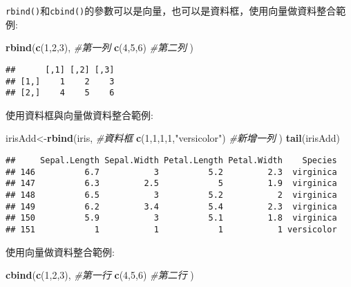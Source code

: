 \documentclass[]{book}
\newenvironment{Shaded}{\begin{snugshade}}{\end{snugshade}}
\newcommand{\KeywordTok}[1]{\textcolor[rgb]{0.13,0.29,0.53}{\textbf{{#1}}}}
\newcommand{\DecValTok}[1]{\textcolor[rgb]{0.00,0.00,0.81}{{#1}}}
\newcommand{\StringTok}[1]{\textcolor[rgb]{0.31,0.60,0.02}{{#1}}}
\newcommand{\CommentTok}[1]{\textcolor[rgb]{0.56,0.35,0.01}{\textit{{#1}}}}
\newcommand{\NormalTok}[1]{{#1}}
\begin{document}
\texttt{rbind()}和\texttt{cbind()}的參數可以是向量，也可以是資料框，使用向量做資料整合範例:

\begin{Shaded}
\begin{Highlighting}[]
\KeywordTok{rbind}\NormalTok{(}\KeywordTok{c}\NormalTok{(}\DecValTok{1}\NormalTok{,}\DecValTok{2}\NormalTok{,}\DecValTok{3}\NormalTok{), }\CommentTok{#第一列}
      \KeywordTok{c}\NormalTok{(}\DecValTok{4}\NormalTok{,}\DecValTok{5}\NormalTok{,}\DecValTok{6}\NormalTok{)  }\CommentTok{#第二列}
      \NormalTok{) }
\end{Highlighting}
\end{Shaded}

\begin{verbatim}
##      [,1] [,2] [,3]
## [1,]    1    2    3
## [2,]    4    5    6
\end{verbatim}

使用資料框與向量做資料整合範例:

\begin{Shaded}
\begin{Highlighting}[]
\NormalTok{irisAdd<-}\KeywordTok{rbind}\NormalTok{(iris, }\CommentTok{#資料框}
      \KeywordTok{c}\NormalTok{(}\DecValTok{1}\NormalTok{,}\DecValTok{1}\NormalTok{,}\DecValTok{1}\NormalTok{,}\DecValTok{1}\NormalTok{,}\StringTok{"versicolor"}\NormalTok{)  }\CommentTok{#新增一列}
      \NormalTok{) }
\KeywordTok{tail}\NormalTok{(irisAdd)}
\end{Highlighting}
\end{Shaded}

\begin{verbatim}
##     Sepal.Length Sepal.Width Petal.Length Petal.Width    Species
## 146          6.7           3          5.2         2.3  virginica
## 147          6.3         2.5            5         1.9  virginica
## 148          6.5           3          5.2           2  virginica
## 149          6.2         3.4          5.4         2.3  virginica
## 150          5.9           3          5.1         1.8  virginica
## 151            1           1            1           1 versicolor
\end{verbatim}

使用向量做資料整合範例:

\begin{Shaded}
\begin{Highlighting}[]
\KeywordTok{cbind}\NormalTok{(}\KeywordTok{c}\NormalTok{(}\DecValTok{1}\NormalTok{,}\DecValTok{2}\NormalTok{,}\DecValTok{3}\NormalTok{), }\CommentTok{#第一行}
      \KeywordTok{c}\NormalTok{(}\DecValTok{4}\NormalTok{,}\DecValTok{5}\NormalTok{,}\DecValTok{6}\NormalTok{)  }\CommentTok{#第二行}
      \NormalTok{) }
\end{Highlighting}
\end{Shaded}
\end{document}
